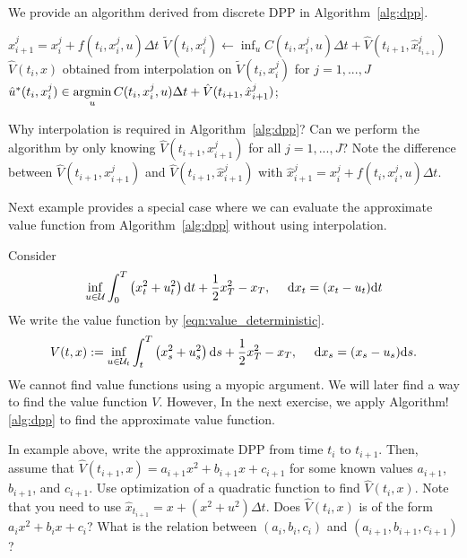 \documentclass[11pt]{book}
\newcommand{\dt}{\text{\normalfont d}t}
\newcommand{\ds}{\text{\normalfont d}s}
\newcommand{\dx}{\text{\normalfont d}x}
\begin{document}
We provide an algorithm derived from discrete DPP in Algorithm~\ref{alg:dpp}.
\begin{algorithm}
        {$\hat{x}^j_{i+1}=x_i^j+f(t_{i},x_i^j,u)\Delta t$\;
        $\tilde{V}(t_{i},x^j_i)\leftarrow \inf_{u}C(t_{i},{x}^j_{i},u){{\Delta t}}+\hat{V}(t_{i+1},\hat{x}^j_{t_{i+1}})$\;
        $\hat{V}(t_{i},x)$ obtained from interpolation on $\tilde{V}(t_{i},x^j_i)$ for $j=1,...,J$\;
        $\hat{u}^*(t_i,x_i^j)\in\mathop{\text{\normalfont argmin}}\limits_{u}C(t_{i},{x}^j_{i},u){{\Delta t}}+\hat{V}(t_{i+1},\hat{x}^j_{i+1})$;
        }
        \caption{Numerical DPP}
         \label{alg:dpp}
\end{algorithm}
\begin{ex}
    Why interpolation is required in Algorithm~\ref{alg:dpp}? Can we perform the algorithm by only knowing  $\hat{V}(t_{i+1},{x}^j_{i+1})$ for all $j=1,...,J$? 
    Note the difference between $\hat{V}(t_{i+1},{x}^j_{i+1})$ and $\hat{V}(t_{i+1},\hat{x}^j_{i+1})$ with $\hat{x}^j_{i+1} = {x}^j_{i} + f(t_{i},x_i^j,u)\Delta t$.
\end{ex}
Next example provides a special case where we can evaluate the approximate value function from Algorithm~\ref{alg:dpp} without using interpolation.
\begin{eg}
    Consider 
    \begin{equation}
    \inf_{u\in\mathcal{U}} \int_0^T\left(x_t^2+u_t^2\right){\dt}+\frac12x_T^2-x_T,~~~~{\dx}_t=(x_t-u_t){\dt}
\end{equation}
We write the value function by \eqref{eqn:value_deterministic}. 
\begin{equation}
    V(t,x):= \inf_{u\in\mathcal{U}_{t}}\int_t^T\left(x_s^2+u_s^2\right){{\ds}}+\frac12x_T^2-x_T,~~~~{\dx}_s=(x_s-u_s){{\ds}}.
\end{equation}
We cannot find value functions using a myopic argument. We will later find a way to find the value function $V$. However, In the next exercise, we apply Algorithm!\ref{alg:dpp} to find the approximate value function.  
\end{eg}
\begin{ex}\label{ex:discrete_lqc}
    In example above, write the approximate DPP from time $t_{i}$ to $t_{i+1}$. Then, assume that $\hat{V}(t_{i+1},x)=a_{i+1}x^2+b_{i+1}x+c_{i+1}$ for some known values $a_{i+1}$, $b_{i+1}$, and $c_{i+1}$. Use  optimization of a quadratic function to find $\hat{V}(t_{i},x)$. Note that you need to use $\hat{x}_{t_{i+1}}=x+(x^2+u^2)\Delta t$. Does $\hat{V}(t_{i},x)$ is of the form $a_{i}x^2+b_{i}x+c_{i}$? What is the relation between $(a_{i},b_{i},c_{i})$ and $(a_{i+1},b_{i+1},c_{i+1})$?
\end{ex}
\end{document}
